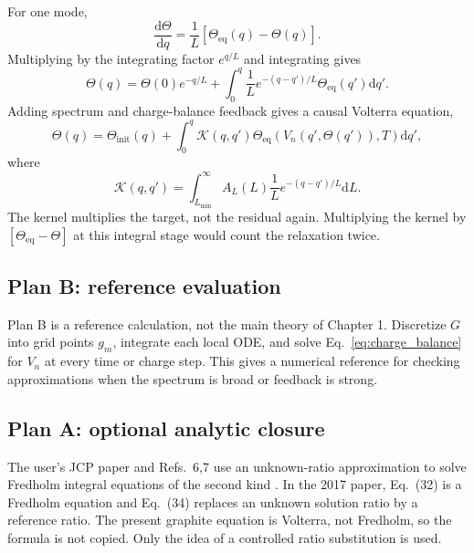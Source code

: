 \documentclass[11pt,a4paper]{article}
\newcommand{\dd}{\mathrm{d}}
\newcommand{\eq}{\mathrm{eq}}
\begin{document}
For one mode,
\begin{equation}
\frac{\dd\Theta}{\dd q}=\frac{1}{L}[\Theta_{\eq}(q)-\Theta(q)].
\end{equation}
Multiplying by the integrating factor $e^{q/L}$ and integrating gives
\begin{equation}
\Theta(q)=\Theta(0)e^{-q/L}+\int_0^q\frac{1}{L}e^{-(q-q')/L}\Theta_{\eq}(q')\dd q'.
\label{eq:singlemode_integral}
\end{equation}
Adding spectrum and charge-balance feedback gives a causal Volterra equation,
\begin{equation}
\Theta(q)=\Theta_{\mathrm{init}}(q)+\int_0^q\mathcal K(q,q')
\Theta_{\eq}\left(V_n(q',\Theta(q')),T\right)\dd q',
\label{eq:volterra}
\end{equation}
where
\begin{equation}
\mathcal K(q,q')=\int_{L_{\min}}^\infty A_L(L)\frac{1}{L}e^{-(q-q')/L}\dd L.
\end{equation}
The kernel multiplies the target, not the residual again. Multiplying the kernel by $[\Theta_{\eq}-\Theta]$ at this integral stage would count
the relaxation twice.

\subsection{Plan B: reference evaluation}\label{sec:planB}
Plan B is a reference calculation, not the main theory of Chapter 1. Discretize $G$ into grid points $g_m$, integrate each local ODE, and solve
Eq.~\eqref{eq:charge_balance} for $V_n$ at every time or charge step. This gives a numerical reference for checking approximations when the
spectrum is broad or feedback is strong.

\subsection{Plan A: optional analytic closure}\label{sec:planA}
The user's JCP paper and Refs.~6,7 use an unknown-ratio approximation to solve Fredholm integral equations of the second kind
\cite{lee2011,son2013,jcp2017}. In the 2017 paper, Eq.~(32) is a Fredholm equation and Eq.~(34) replaces an unknown solution ratio by a
reference ratio. The present graphite equation is Volterra, not Fredholm, so the formula is not copied. Only the idea of a controlled ratio
substitution is used.
\end{document}
